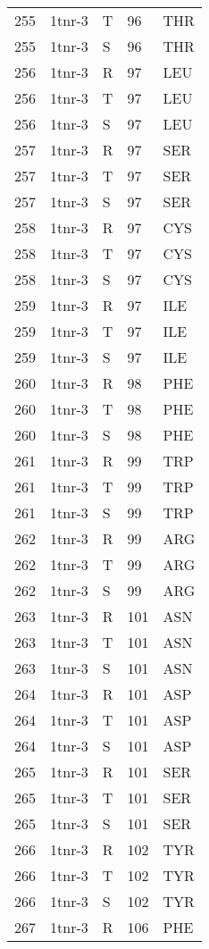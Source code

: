 \begin{tiny}
\begin{longtable}[l]{l|l|l|l|l}
	255 & 1tnr-3 & T & 96 & THR \\
	255 & 1tnr-3 & S & 96 & THR \\
	256 & 1tnr-3 & R & 97 & LEU \\
	256 & 1tnr-3 & T & 97 & LEU \\
	256 & 1tnr-3 & S & 97 & LEU \\
	257 & 1tnr-3 & R & 97 & SER \\
	257 & 1tnr-3 & T & 97 & SER \\
	257 & 1tnr-3 & S & 97 & SER \\
	258 & 1tnr-3 & R & 97 & CYS \\
	258 & 1tnr-3 & T & 97 & CYS \\
	258 & 1tnr-3 & S & 97 & CYS \\
	259 & 1tnr-3 & R & 97 & ILE \\
	259 & 1tnr-3 & T & 97 & ILE \\
	259 & 1tnr-3 & S & 97 & ILE \\
	260 & 1tnr-3 & R & 98 & PHE \\
	260 & 1tnr-3 & T & 98 & PHE \\
	260 & 1tnr-3 & S & 98 & PHE \\
	261 & 1tnr-3 & R & 99 & TRP \\
	261 & 1tnr-3 & T & 99 & TRP \\
	261 & 1tnr-3 & S & 99 & TRP \\
	262 & 1tnr-3 & R & 99 & ARG \\
	262 & 1tnr-3 & T & 99 & ARG \\
	262 & 1tnr-3 & S & 99 & ARG \\
	263 & 1tnr-3 & R & 101 & ASN \\
	263 & 1tnr-3 & T & 101 & ASN \\
	263 & 1tnr-3 & S & 101 & ASN \\
	264 & 1tnr-3 & R & 101 & ASP \\
	264 & 1tnr-3 & T & 101 & ASP \\
	264 & 1tnr-3 & S & 101 & ASP \\
	265 & 1tnr-3 & R & 101 & SER \\
	265 & 1tnr-3 & T & 101 & SER \\
	265 & 1tnr-3 & S & 101 & SER \\
	266 & 1tnr-3 & R & 102 & TYR \\
	266 & 1tnr-3 & T & 102 & TYR \\
	266 & 1tnr-3 & S & 102 & TYR \\
	267 & 1tnr-3 & R & 106 & PHE \\

\end{longtable}
\end{tiny}
